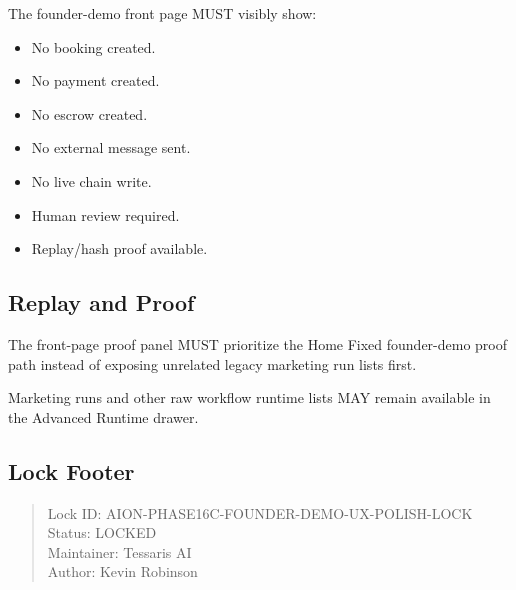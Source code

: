 The founder-demo front page MUST visibly show:

\begin{itemize}
  \item No booking created.
  \item No payment created.
  \item No escrow created.
  \item No external message sent.
  \item No live chain write.
  \item Human review required.
  \item Replay/hash proof available.
\end{itemize}

\subsection{Replay and Proof}

The front-page proof panel MUST prioritize the Home Fixed founder-demo proof
path instead of exposing unrelated legacy marketing run lists first.

Marketing runs and other raw workflow runtime lists MAY remain available in the
Advanced Runtime drawer.

\subsection{Lock Footer}

\begin{quote}
Lock ID: AION-PHASE16C-FOUNDER-DEMO-UX-POLISH-LOCK\\
Status: LOCKED\\
Maintainer: Tessaris AI\\
Author: Kevin Robinson
\end{quote}
